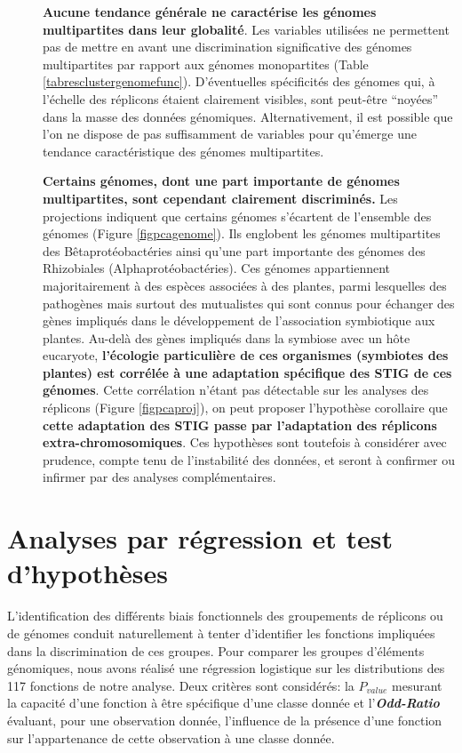 \begin{description}
	\item[\textbullet] \textbf{Aucune tendance générale ne caractérise les génomes multipartites dans leur globalité}. Les variables utilisées ne permettent pas de mettre en avant une discrimination significative des génomes multipartites par rapport aux génomes monopartites (Table \ref{tabresclustergenomefunc}). D'éventuelles spécificités des génomes qui, à l'échelle des réplicons étaient clairement visibles, sont peut-être “noyées” dans la masse des données génomiques. Alternativement, il est possible que l'on ne dispose de pas suffisamment de variables pour qu’émerge une tendance caractéristique des génomes multipartites.
	
	\item[\textbullet] \textbf{Certains génomes, dont une part importante de génomes multipartites, sont cependant clairement discriminés.} Les projections indiquent que certains génomes s'écartent de l'ensemble des génomes (Figure \ref{figpcagenome}). Ils englobent les génomes multipartites des Bêtaprotéobactéries ainsi qu'une part importante des génomes des Rhizobiales (Alphaprotéobactéries). Ces génomes appartiennent majoritairement à des espèces associées à des plantes, parmi lesquelles des pathogènes mais surtout des mutualistes qui sont connus pour échanger des gènes impliqués dans le développement de l'association symbiotique aux plantes. Au-delà des gènes impliqués dans la symbiose avec un hôte eucaryote, \textbf{\color{orange} l'écologie particulière de ces organismes (symbiotes des plantes) est corrélée à une adaptation spécifique des STIG de ces génomes}. Cette corrélation n'étant pas détectable sur les analyses des réplicons (Figure \ref{figpcaproj}), on peut proposer l'hypothèse corollaire que \textbf{\color{orange} cette adaptation des STIG passe par l'adaptation des réplicons extra-chromosomiques}. Ces hypothèses sont toutefois à considérer avec prudence, compte tenu de l'instabilité des données, et seront à confirmer ou infirmer par des analyses complémentaires.
\end{description}
	 
	
\section{Analyses par régression et test d'hypothèses}
 	L'identification des différents biais fonctionnels des groupements de réplicons ou de génomes conduit naturellement à tenter d'identifier les fonctions impliquées dans la discrimination de ces groupes. Pour comparer les groupes d'éléments génomiques, nous avons réalisé une régression logistique sur les distributions des 117 fonctions de notre analyse. Deux critères sont considérés: la \textbf{\textit{$P_{value}$}} mesurant la capacité d'une fonction à être spécifique d'une classe donnée et l'\textbf{\textit{Odd-Ratio}} évaluant, pour une observation donnée, l'influence de la présence d'une fonction sur l'appartenance de cette observation à une classe donnée.

